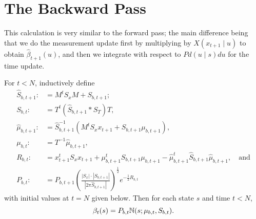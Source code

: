 \documentclass[12pt,leqno]{article}
\begin{document}
\section{The Backward Pass}
This calculation is very similar to the forward pass; the main difference being that we do
the measurement update first by multiplying by $X(x_{t+1}\mid u)$ to obtain $\hat{\beta}_{t+1}(u)$,
and then we integrate with respect to $Pd(u\mid s)du$ for the time update.  

\begin{Thm}\label{beta:1}
  For $t < N$, inductively define
\begin{align*}
  \hat{S}_{b,t+1} :&= M^tS_xM + S_{b,t+1};\\
  S_{b,t} :&= T^t(\hat{S}_{b,t+1}*S_T)T,\\
  \hat{\mu}_{b,t+1} :&= \hat{S}_{b,t+1}^{-1}(M^tS_xx_{t+1} + S_{b,t+1}\mu_{b,t+1}),\\
  \mu_{b,t} :&= T^{-1}\hat{\mu}_{b,t+1},\\
  R_{b,t} :&= x_{t+1}^tS_xx_{t+1} + \mu_{b,t+1}^tS_{b,t+1}\mu_{b,t+1} - \hat{\mu}_{b,t+1}^t\hat{S}_{b,t+1}\hat{\mu}_{b,t+1},\quad\text{and}\\
  P_{b,t} :&= P_{b,t+1}\left(\frac{|S_x|\cdot|S_{b,t+1}|}{|2\pi\hat{S}_{b,t+1}|}\right)^{\frac{1}{2}}e^{-\frac{1}{2}R_{b,t}}
\end{align*}
with initial values at $t = N$ given below. Then for each state $s$ and time $t < N$,
$$
  \beta_t(s) = P_{b,t}{\mathbb N}(s;\mu_{b,t},S_{b,t}).
$$
\end{Thm}
\end{document}
